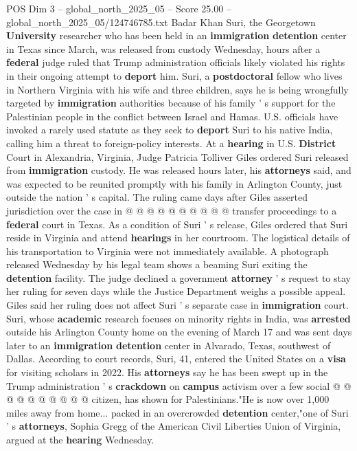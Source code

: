 \begin{textsample}{POS Dim 3 – global\_north\_2025\_05 – Score 25.00 – global\_north\_2025\_05/124746785.txt}  \label{ex:f3_pos_150}
Badar Khan Suri, the Georgetown \textbf{University} researcher who has been held in an \textbf{immigration} \textbf{detention} center in Texas since March, was released from custody Wednesday, hours after a \textbf{federal} judge ruled that Trump administration officials likely violated his rights in their ongoing attempt to \textbf{deport} him.
Suri, a \textbf{postdoctoral} fellow who lives in Northern Virginia with his wife and three children, says he is being wrongfully targeted by \textbf{immigration} authorities because of his family ' s support for the Palestinian people in the conflict between Israel and Hamas.
U.S. officials have invoked a rarely used statute as they seek to \textbf{deport} Suri to his native India, calling him a threat to foreign-policy interests.
At a \textbf{hearing} in U.S. \textbf{District} Court in Alexandria, Virginia, Judge Patricia Tolliver Giles ordered Suri released from \textbf{immigration} custody.
He was released hours later, his \textbf{attorneys} said, and was expected to be reunited promptly with his family in Arlington County, just outside the nation ' s capital.
The ruling came days after Giles asserted jurisdiction over the case in @ @ @ @ @ @ @ @ @ @ transfer proceedings to a \textbf{federal} court in Texas.
As a condition of Suri ' s release, Giles ordered that Suri reside in Virginia and attend \textbf{hearings} in her courtroom.
The logistical details of his transportation to Virginia were not immediately available.
A photograph released Wednesday by his legal team shows a beaming Suri exiting the \textbf{detention} facility.
The judge declined a government \textbf{attorney} ' s request to stay her ruling for seven days while the Justice Department weighs a possible appeal.
Giles said her ruling does not affect Suri ' s separate case in \textbf{immigration} court.
Suri, whose \textbf{academic} research focuses on minority rights in India, was \textbf{arrested} outside his Arlington County home on the evening of March 17 and was sent days later to an \textbf{immigration} \textbf{detention} center in Alvarado, Texas, southwest of Dallas.
According to court records, Suri, 41, entered the United States on a \textbf{visa} for visiting scholars in 2022.
His \textbf{attorneys} say he has been swept up in the Trump administration ' s \textbf{crackdown} on \textbf{campus} activism over a few social @ @ @ @ @ @ @ @ @ @ citizen, has shown for Palestinians."He is now over 1,000 miles away from home... packed in an overcrowded \textbf{detention} center,"one of Suri ' s \textbf{attorneys}, Sophia Gregg of the American Civil Liberties Union of Virginia, argued at the \textbf{hearing} Wednesday.

\end{textsample}
